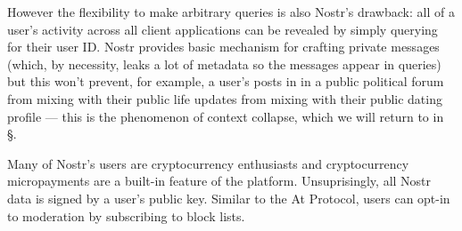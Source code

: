 However the flexibility to make arbitrary queries is also Nostr's drawback:
all of a user's activity across all client applications can be revealed by simply querying for their user ID.
Nostr provides basic mechanism for crafting private messages (which, by necessity, leaks a lot of metadata so the messages appear in queries)
but this won't prevent, for example, a user's posts in in a public political forum from mixing with their public life updates from mixing with their public dating profile --- this is the phenomenon of context collapse, which we will return to in \S.

Many of Nostr's users are cryptocurrency enthusiasts and cryptocurrency micropayments are a built-in feature of the platform. Unsuprisingly, all Nostr data is signed by a user's public key.
Similar to the At Protocol, users can opt-in to moderation by subscribing to block lists.







